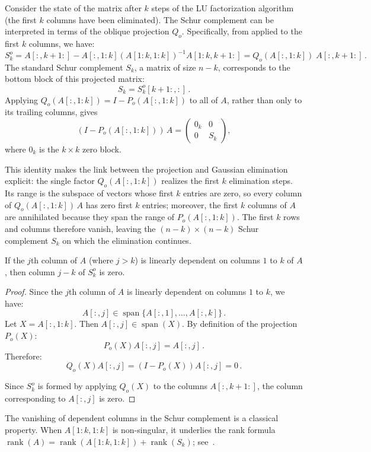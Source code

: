 \documentclass[10pt,twoside]{siamart1116}
\DeclareMathOperator{\rk}{rank}
\DeclareMathOperator{\spn}{span}
\numberwithin{theorem}{section}
\begin{document}
Consider the state of the matrix after $k$ steps of the LU factorization algorithm (the first $k$ columns have been eliminated). The Schur complement can be interpreted in terms of the oblique projection $Q_o$. Specifically, from  applied to the first $k$ columns, we have:
\[ S^o_k = A[:,k+1:] - A[:,1:k] {(A[1:k,1:k])}^{-1} A[1:k,k+1:]
  = Q_o(A[:,1:k]) \; A[:,k+1:] \,.
\]
The standard Schur complement $S_k$, a matrix of size $n-k$, corresponds to the bottom block of this projected matrix:
\[ S_k = S^o_k[k+1:,:] \,. \]
Applying $Q_o(A[:,1:k]) = I - P_o(A[:,1:k])$ to all of $A$, rather than only to its trailing columns, gives
\[ (I - P_o(A[:,1:k])) \, A =
  \begin{pmatrix}
    0_k & 0   \\
    0   & S_k
  \end{pmatrix},
\]
where $0_k$ is the $k \times k$ zero block.

This identity makes the link between the projection and Gaussian elimination explicit: the single factor $Q_o(A[:,1:k])$ realizes the first $k$ elimination steps. Its range is the subspace of vectors whose first $k$ entries are zero, so every column of $Q_o(A[:,1:k])\,A$ has zero first $k$ entries; moreover, the first $k$ columns of $A$ are annihilated because they span the range of $P_o(A[:,1:k])$. The first $k$ rows and columns therefore vanish, leaving the $(n-k) \times (n-k)$ Schur complement $S_k$ on which the elimination continues.

\begin{lemma}\label{lem:oblique}
  If the $j$th column of $A$ (where $j > k$) is linearly dependent on columns $1$ to $k$ of $A$, then column $j - k$ of $S^o_k$ is zero.
\end{lemma}

\begin{proof}
  Since the $j$th column of $A$ is linearly dependent on columns $1$ to $k$, we have:
  \[ A[:,j] \in \spn\{ A[:,1], \ldots, A[:,k] \} \,. \] %
  Let $X = A[:,1:k]$. Then $A[:,j] \in \spn(X)$. By definition of the projection $P_o(X)$:
  \[ P_o(X) A[:,j] = A[:,j] \,. \]
  Therefore:
  \[ Q_o(X) A[:,j] = (I - P_o(X)) A[:,j] = 0 \,. \]

  Since $S^o_k$ is formed by applying $Q_o(X)$ to the columns $A[:,k+1:]$, the column corresponding to $A[:,j]$ is zero.
\end{proof}

The vanishing of dependent columns in the Schur complement is a classical property. When $A[1:k,1:k]$ is non-singular, it underlies the rank formula $\rk(A) = \rk(A[1:k,1:k]) + \rk(S_k)$; see~\cite{Marsaglia_1974,Carlson_1986,Cottle_1974}.
\end{document}
